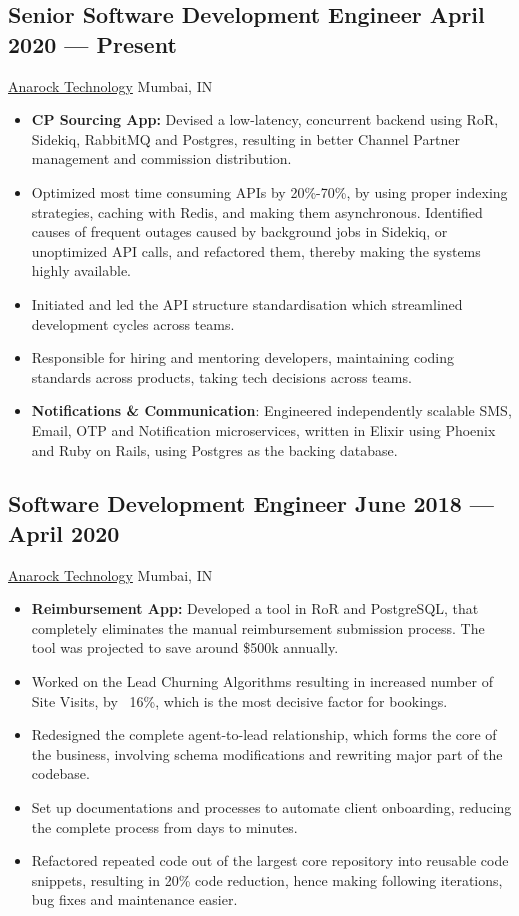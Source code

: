 \documentclass[a4,10pt]{article}
\newcommand{\subtext}[1]{
#1\par\vspace{-0.2cm}}
\newenvironment{zitemize}{
\begin{itemize}\itemsep0pt \parskip0pt \parsep1pt}
{\end{itemize}\vspace{-0.5cm}}
\begin{document}
\subsection*{Senior Software Development Engineer \hfill April 2020 --- Present} 
\subtext{\href{https://tech.anarock.com/}{Anarock Technology} \hfill Mumbai, IN} 
    \begin{zitemize}

        \item {\bf CP Sourcing App: } Devised a low-latency, concurrent backend using RoR, Sidekiq, RabbitMQ and Postgres, resulting in better Channel Partner management and commission distribution.
        \item Optimized most time consuming APIs by 20\%-70\%, by using proper indexing strategies, caching with Redis, and making them asynchronous. Identified causes of frequent outages caused by background jobs in Sidekiq, or unoptimized API calls, and refactored them, thereby making the systems highly available.
        \item Initiated and led the API structure standardisation which streamlined development cycles across teams.
        \item Responsible for hiring and mentoring developers, maintaining coding standards across products, taking tech decisions across teams.
        \item {\bf Notifications \& Communication}: Engineered independently scalable SMS, Email, OTP and Notification microservices, written in Elixir using Phoenix and Ruby on Rails, using Postgres as the backing database.
    \end{zitemize}

\subsection*{Software Development Engineer \hfill June 2018 --- April 2020} 
\subtext{\href{https://tech.anarock.com/}{Anarock Technology} \hfill Mumbai, IN} 
    \begin{zitemize}
        \item {\bf Reimbursement App: } Developed a tool in RoR and PostgreSQL, that completely eliminates the manual reimbursement submission process. The tool was projected to save around \$500k annually.
        \item Worked on the Lead Churning Algorithms resulting in increased number of Site Visits, by ~16\%, which is the most decisive factor for bookings.
        \item Redesigned the complete agent-to-lead relationship, which forms the core of the business, involving schema modifications and rewriting major part of the codebase.
        \item Set up documentations and processes to automate client onboarding, reducing the complete process from days to minutes.
        \item Refactored repeated code out of the largest core repository into reusable code snippets, resulting in 20\% code reduction, hence making following iterations, bug fixes and maintenance easier.
    \end{zitemize}        
\end{document}
